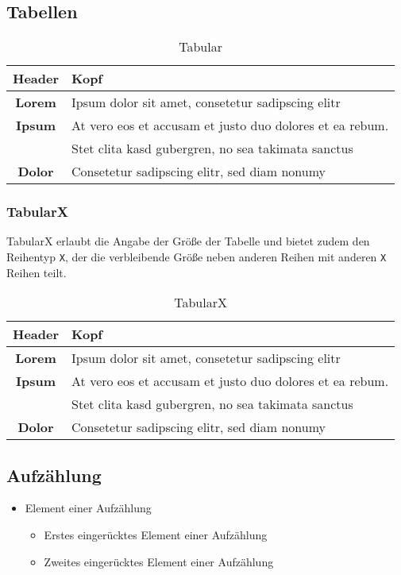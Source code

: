 \subsection{Tabellen}
\begin{table}[H]
	\center
	\begin{tabular}{| c | l |}
		\hline Header & Kopf\\ \hline\hline
		\textbf{Lorem} & Ipsum dolor sit amet, consetetur sadipscing elitr\\ \hline
		\textbf{Ipsum} & At vero eos et accusam et justo duo dolores et ea rebum.\\
			& Stet clita kasd gubergren, no sea takimata sanctus\\ \hline
		\textbf{Dolor} & Consetetur sadipscing elitr, sed diam nonumy\\\hline
	\end{tabular}
	\caption{Tabular}
	\label{tab:tabular}
\end{table}

\subsubsection{TabularX}
TabularX erlaubt die Angabe der Größe der Tabelle und bietet zudem den Reihentyp \texttt{X}, der die verbleibende Größe neben anderen Reihen mit anderen \texttt{X} Reihen teilt.
\begin{table}[H]
    \center
    \begin{tabularx}{\textwidth}{| c | X |}
        \hline Header & Kopf\\ \hline\hline
        \textbf{Lorem} & Ipsum dolor sit amet, consetetur sadipscing elitr\\ \hline
        \textbf{Ipsum} & At vero eos et accusam et justo duo dolores et ea rebum.\\
            & Stet clita kasd gubergren, no sea takimata sanctus\\ \hline
        \textbf{Dolor} & Consetetur sadipscing elitr, sed diam nonumy\\\hline
    \end{tabularx}
    \caption{TabularX}
    \label{tab:tabularx}
\end{table}

\subsection{Aufzählung}
\begin{itemize}
	\item Element einer Aufzählung
	\begin{itemize}
        \item Erstes eingerücktes Element einer Aufzählung
        \item Zweites eingerücktes Element einer Aufzählung
    \end{itemize}
\end{itemize}

